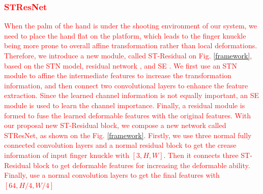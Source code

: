 \textcolor{red}{\subsubsection{STResNet} When the palm of the hand is under the shooting environment of our system, we need to place the hand flat on the platform, which leads to the finger knuckle being more prone to overall affine transformation rather than local deformations. Therefore, we introduce a new module, called ST-Residual on Fig. \ref{framework}, based on the STN model, residual network \cite{he2016deep}, and SE \cite{hu2018squeeze}. We first use an STN module to affine the intermediate features to increase the transformation information, and then connect two convolutional layers to enhance the feature extraction. Since the learned channel information is not equally important, an SE module is used to learn the channel importance. Finally, a residual module is formed to fuse the learned deformable features with the original features. With our proposal new ST-Residual block, we compose a new network called STResNet, as shown on the Fig. \ref{framework}. Firstly, we use three normal fully connected convolution layers and a normal residual block to get the crease information of input finger knuckle with $[3, H, W]$. Then it connects three ST-Residual block to get deformable features for increasing the deformable ability. Finally, use a normal convolution layers to get the final features with $[64, H/4, W/4]$}



